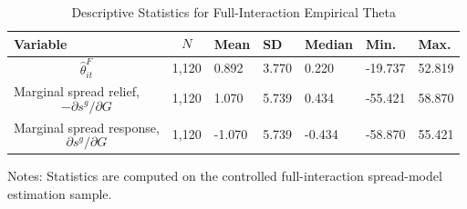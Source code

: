 \begin{table}[H]\centering
\begin{threeparttable}
\caption{Descriptive Statistics for Full-Interaction Empirical Theta}
\label{tab:theta_descriptive_stats}
\scriptsize
\begin{tabularx}{\textwidth}{lYYYYYY}
\toprule
Variable & $$N$$ & Mean & SD & Median & Min. & Max. \\
\midrule
$$\widehat{\theta}^{F}_{it}$$ & 1,120 & 0.892 & 3.770 & 0.220 & -19.737 & 52.819 \\
Marginal spread relief, $$-\partial s^g/\partial G$$ & 1,120 & 1.070 & 5.739 & 0.434 & -55.421 & 58.870 \\
Marginal spread response, $$\partial s^g/\partial G$$ & 1,120 & -1.070 & 5.739 & -0.434 & -58.870 & 55.421 \\
\bottomrule
\end{tabularx}
\begin{tablenotes}[flushleft]\footnotesize
\item Notes: Statistics are computed on the controlled full-interaction spread-model estimation sample.
\end{tablenotes}
\end{threeparttable}
\end{table}
